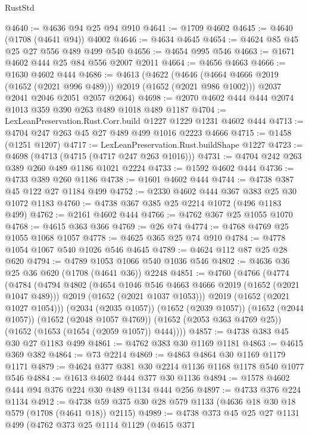 \begin{lexlean}{RustStd}
\begin{coremodule}
@4640 := @4636 @94 @25 @94 @910
@4641 := @1709 @4602
@4645 := @4640 (@1708 (@4641 @94)) @4002
@4646 := @4634 @4645
@4654 := @4624 @85 @45 @25 @27 @556 @489 @499 @540
@4656 := @4654 @995 @546
@4663 := @1671 @4602 @444 @25 @84 @556 @2007 @2011
@4664 := @4656 @4663
@4666 := @1630 @4602 @444
@4686 := @4613
    (@4622
      (@4646 (@4664 @4666 @2019 (@1652 (@2021 @996 @489))) @2019 (@1652 (@2021 @986 @1002)))
      @2037
      @2041
      @2046
      @2051
      @2057
      @2064)
@4698 := @2070 @4602 @444 @444 @2074 @1013 @359 @390 @263 @489 @1018 @489 @1187
@4704 := LexLeanPreservation.Rust.Corr.build @1227 @1229 @1231 @4602 @444
@4713 := @4704 @247 @263 @45 @27 @489 @499 @1016 @2223 @4666
@4715 := @1458 (@1251 @1207)
@4717 := LexLeanPreservation.Rust.buildShape @1227
@4723 := @4698 (@4713 (@4715 (@4717 @247 @263 @1016)))
@4731 := @4704 @242 @263 @389 @260 @489 @1186 @1021 @2224
@4733 := @1592 @4602 @444
@4736 := @4733 @389 @260 @1186
@4738 := @1601 @4602 @444
@4744 := @4738 @387 @45 @122 @27 @1184 @499
@4752 := @2330 @4602 @444 @367 @383 @25 @30 @1072 @1183
@4760 := @4738 @367 @385 @25 @2214 @1072 (@496 @1183 @499)
@4762 := @2161 @4602 @444
@4766 := @4762 @367 @25 @1055 @1070
@4768 := @4615 @363 @366
@4769 := @26 @74
@4774 := @4768 @4769 @25 @1055 @1068 @1057
@4778 := @4625 @365 @25 @74 @910
@4784 := @4778 @1054 @1067 @540 @1026 @546 @4645
@4789 := @4624 @112 @87 @25 @28 @620
@4794 := @4789 @1053 @1066 @540 @1036 @546
@4802 := @4636 @36 @25 @36 @620 (@1708 (@4641 @36)) @2248
@4851 := @4760
    (@4766
      (@4774
        (@4784
          (@4794
            @4802
            (@4654 @1046 @546 @4663 @4666 @2019 (@1652 (@2021 @1047 @489)))
            @2019
            (@1652 (@2021 @1037 @1053)))
          @2019
          (@1652 (@2021 @1027 @1054)))
        (@2034 (@2035 @1057))
        (@1652 (@2039 @1057))
        (@1652 (@2044 @1057))
        (@1652 (@2048 @1057 @4769))
        (@1652 (@2053 @363 @4769 @25))
        (@1652 (@1653 (@1654 (@2059 @1057)) @444))))
@4857 := @4738 @383 @45 @30 @27 @1183 @499
@4861 := @4762 @383 @30 @1169 @1181
@4863 := @4615 @369 @382
@4864 := @73 @2214
@4869 := @4863 @4864 @30 @1169 @1179 @1171
@4879 := @4624 @377 @381 @30 @2214 @1136 @1168 @1178 @540 @1077 @546
@4884 := @1613 @4602 @444 @377 @30 @1136
@4894 := @1578 @4602 @444 @94 @376 @224 @30 @489 @1134 @444 @256
@4897 := @4733 @376 @224 @1134
@4912 := @4738 @59 @375 @30 @28 @579 @1133 (@4636 @18 @30 @18 @579 (@1708 (@4641 @18)) @2115)
@4989 := @4738
    @373
    @45
    @25
    @27
    @1131
    @499
    (@4762
      @373
      @25
      @1114
      @1129
      (@4615
        @371

\end{coremodule}
\end{lexlean}
